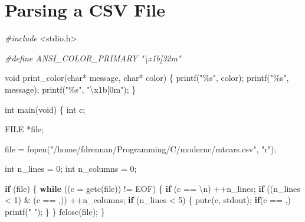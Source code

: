 \documentclass[
]{book}
\newenvironment{Shaded}{\begin{snugshade}}{\end{snugshade}}
\newcommand{\CharTok}[1]{\textcolor[rgb]{0.31,0.60,0.02}{#1}}
\newcommand{\ControlFlowTok}[1]{\textcolor[rgb]{0.13,0.29,0.53}{\textbf{#1}}}
\newcommand{\DataTypeTok}[1]{\textcolor[rgb]{0.13,0.29,0.53}{#1}}
\newcommand{\DecValTok}[1]{\textcolor[rgb]{0.00,0.00,0.81}{#1}}
\newcommand{\ImportTok}[1]{#1}
\newcommand{\NormalTok}[1]{#1}
\newcommand{\PreprocessorTok}[1]{\textcolor[rgb]{0.56,0.35,0.01}{\textit{#1}}}
\newcommand{\SpecialCharTok}[1]{\textcolor[rgb]{0.00,0.00,0.00}{#1}}
\newcommand{\StringTok}[1]{\textcolor[rgb]{0.31,0.60,0.02}{#1}}
\begin{document}
\hypertarget{parsing-a-csv-file}{%
\section{Parsing a CSV File}\label{parsing-a-csv-file}}

\begin{Shaded}
\begin{Highlighting}[]
\PreprocessorTok{\#include }\ImportTok{\textless{}stdio.h\textgreater{}}

\PreprocessorTok{\#define ANSI\_COLOR\_PRIMARY   "\textbackslash{}x1b[32m"}

\DataTypeTok{void}\NormalTok{ print\_color(}\DataTypeTok{char}\NormalTok{* message, }\DataTypeTok{char}\NormalTok{* color) \{}
\NormalTok{    printf(}\StringTok{"\%s"}\NormalTok{, color);}
\NormalTok{    printf(}\StringTok{"\%s"}\NormalTok{, message);}
\NormalTok{    printf(}\StringTok{"\%s"}\NormalTok{, }\StringTok{"}\SpecialCharTok{\textbackslash{}x1b}\StringTok{[0m"}\NormalTok{);}
\NormalTok{\}}

\DataTypeTok{int}\NormalTok{ main(}\DataTypeTok{void}\NormalTok{) \{}
    \DataTypeTok{int}\NormalTok{ c;}

    \DataTypeTok{FILE}\NormalTok{ *file;}

\NormalTok{    file = fopen(}\StringTok{"/home/fdrennan/Programming/C/modernc/mtcars.csv"}\NormalTok{, }\StringTok{"r"}\NormalTok{);}

    \DataTypeTok{int}\NormalTok{ n\_lines = }\DecValTok{0}\NormalTok{;}
    \DataTypeTok{int}\NormalTok{ n\_columns = }\DecValTok{0}\NormalTok{;}

    \ControlFlowTok{if}\NormalTok{ (file) \{}
        \ControlFlowTok{while}\NormalTok{ ((c = getc(file)) != EOF)}
\NormalTok{        \{}
            \ControlFlowTok{if}\NormalTok{ (c == }\CharTok{\textquotesingle{}\textbackslash{}n\textquotesingle{}}\NormalTok{)}
\NormalTok{                ++n\_lines;}
            \ControlFlowTok{if}\NormalTok{ ((n\_lines \textless{} }\DecValTok{1}\NormalTok{) \& (c == }\CharTok{\textquotesingle{},\textquotesingle{}}\NormalTok{))}
\NormalTok{                ++n\_columns;}
            \ControlFlowTok{if}\NormalTok{ (n\_lines \textless{} }\DecValTok{5}\NormalTok{) \{}
\NormalTok{                putc(c, stdout);}
                \ControlFlowTok{if}\NormalTok{(c == }\CharTok{\textquotesingle{},\textquotesingle{}}\NormalTok{)}
\NormalTok{                    printf(}\StringTok{" "}\NormalTok{);}
\NormalTok{            \}}
\NormalTok{        \}}
\NormalTok{        fclose(file);}
\NormalTok{    \}}


\end{Highlighting}
\end{Shaded}
\end{document}
